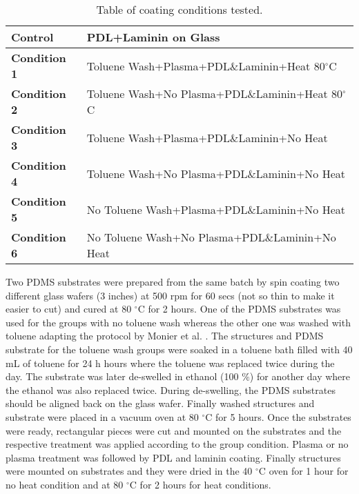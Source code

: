 \documentclass{book}
\begin{document}
\begin{table}[H]
    \centering
    \begin{tabular}{| m{2.5cm}| m{10cm} | }
        \hline
\textbf{Control} & PDL+Laminin on Glass \\ 
\hline
\textbf{Condition 1} & Toluene Wash+Plasma+PDL$\&$Laminin+Heat 80$^{\circ}$C \\ 
\hline
\textbf{Condition 2} & Toluene Wash+No Plasma+PDL$\&$Laminin+Heat 80$^{\circ}$C \\ 
\hline
\textbf{Condition 3} & Toluene Wash+Plasma+PDL$\&$Laminin+No Heat\\ 
\hline
\textbf{Condition 4} & Toluene Wash+No Plasma+PDL$\&$Laminin+No Heat\\ 
\hline
\textbf{Condition 5} & No Toluene Wash+Plasma+PDL$\&$Laminin+No Heat\\ 
\hline
\textbf{Condition 6} & No Toluene Wash+No Plasma+PDL$\&$Laminin+No Heat\\ 
\hline
    \end{tabular}
    \caption{Table of coating conditions tested.}
    \label{coatingtests}
    
\end{table}

Two PDMS substrates were prepared from the same batch by spin coating two different glass wafers (3 inches) at 500 rpm for 60 secs (not so thin to make it easier to cut) and cured at 80 $^{\circ}$C for 2 hours. One of the PDMS substrates was used for the groups with no toluene wash whereas the other one was washed with toluene adapting the protocol by Monier et al. \cite{martin2021nanoscale}. The structures and PDMS substrate for the toluene wash groups were soaked in a toluene bath filled with 40 mL of toluene for 24 h hours where the toluene was replaced twice during the day. The substrate was later de-swelled in ethanol (100 $\%$) for another day where the ethanol was also replaced twice. During de-swelling, the PDMS substrates should be aligned back on the glass wafer. Finally washed structures and substrate were placed in a vacuum oven at 80 $^{\circ}$C for 5 hours. Once the substrates were ready, rectangular pieces were cut and mounted on the substrates and the respective treatment was applied according to the group condition. Plasma or no plasma treatment was followed by PDL and laminin coating. Finally structures were mounted on substrates and they were dried in the 40 $^{\circ}$C oven for 1 hour for no heat condition and at 80 $^{\circ}$C for 2 hours for heat conditions.
\end{document}
